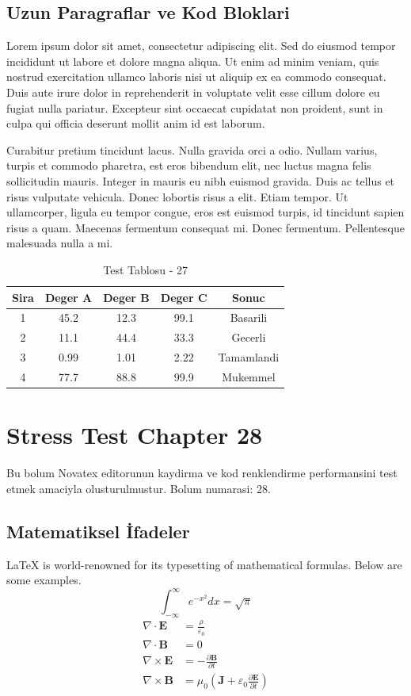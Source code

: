 \documentclass[12pt,a4paper]{article}
\begin{document}
\subsection{Uzun Paragraflar ve Kod Bloklari}
Lorem ipsum dolor sit amet, consectetur adipiscing elit. Sed do eiusmod tempor incididunt ut labore et dolore magna aliqua. Ut enim ad minim veniam, quis nostrud exercitation ullamco laboris nisi ut aliquip ex ea commodo consequat. Duis aute irure dolor in reprehenderit in voluptate velit esse cillum dolore eu fugiat nulla pariatur. Excepteur sint occaecat cupidatat non proident, sunt in culpa qui officia deserunt mollit anim id est laborum.

Curabitur pretium tincidunt lacus. Nulla gravida orci a odio. Nullam varius, turpis et commodo pharetra, est eros bibendum elit, nec luctus magna felis sollicitudin mauris. Integer in mauris eu nibh euismod gravida. Duis ac tellus et risus vulputate vehicula. Donec lobortis risus a elit. Etiam tempor. Ut ullamcorper, ligula eu tempor congue, eros est euismod turpis, id tincidunt sapien risus a quam. Maecenas fermentum consequat mi. Donec fermentum. Pellentesque malesuada nulla a mi.

\begin{table}[h!]
\centering
\begin{tabular}{|c|c|c|c|c|}
\hline
\textbf{Sira} & \textbf{Deger A} & \textbf{Deger B} & \textbf{Deger C} & \textbf{Sonuc} \\
\hline
1 & 45.2 & 12.3 & 99.1 & Basarili \\
2 & 11.1 & 44.4 & 33.3 & Gecerli \\
3 & 0.99 & 1.01 & 2.22 & Tamamlandi \\
4 & 77.7 & 88.8 & 99.9 & Mukemmel \\
\hline
\end{tabular}
\caption{Test Tablosu - 27}
\end{table}

\newpage
\section{Stress Test Chapter 28}
Bu bolum Novatex editorunun kaydirma ve kod renklendirme performansini test etmek amaciyla olusturulmustur. Bolum numarasi: 28.

\subsection{Matematiksel İfadeler}
\LaTeX{} is world-renowned for its typesetting of mathematical formulas. Below are some examples.
\begin{equation}
\int_{-\infty}^{\infty} e^{-x^2} dx = \sqrt{\pi}
\end{equation}
\begin{align}
\nabla \cdot \mathbf{E} &= \frac{\rho}{\varepsilon_0} \\
\nabla \cdot \mathbf{B} &= 0 \\
\nabla \times \mathbf{E} &= -\frac{\partial \mathbf{B}}{\partial t} \\
\nabla \times \mathbf{B} &= \mu_0\left(\mathbf{J} + \varepsilon_0 \frac{\partial \mathbf{E}}{\partial t}\right)
\end{align}
\end{document}

